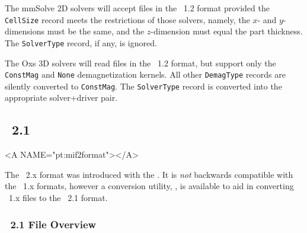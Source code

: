 The mmSolve 2D solvers will accept files in the \MIF~1.2 format provided
the \texttt{CellSize} record meets the restrictions of those solvers,
namely, the $x$- and $y$-dimensions must be the same, and the
$z$-dimension must equal the part thickness.  The \texttt{SolverType}
record, if any, is ignored.

The Oxs 3D solvers will read files in the \MIF~1.2 format, but support
only the \texttt{ConstMag} and \texttt{None} demagnetization kernels.
All other \texttt{DemagType} records are silently converted
to \texttt{ConstMag}.  The \texttt{SolverType} record is converted into
the appropriate solver+driver pair.

\subsection{\MIF\ 2.1}\label{sec:mif2format}
\begin{rawhtml}
<A NAME="pt:mif2format"></A>
\end{rawhtml}
The \MIF~2.x format was introduced with the
.
It is \textit{not} backwards compatible with the \MIF~1.x formats,
however a conversion utility,
, is available
to aid in converting \MIF~1.x files to the \MIF~2.1 format.

\subsubsection{\MIF\ 2.1 File Overview}%
\label{sec:mif2overview}

